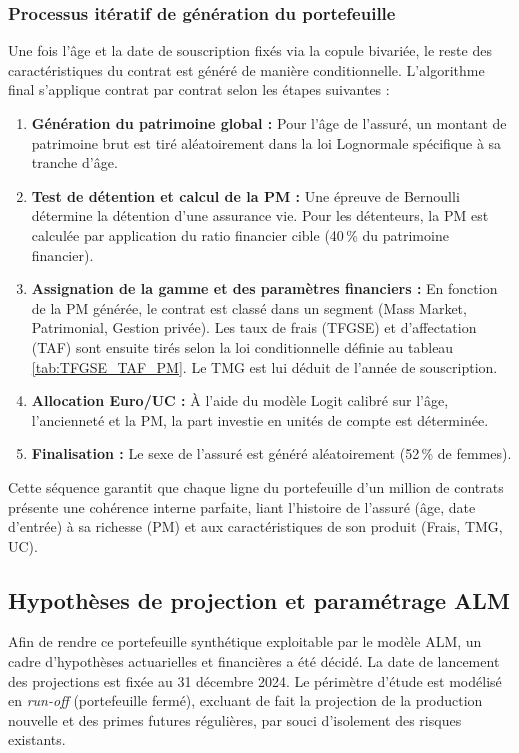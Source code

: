 \subsubsection{Processus itératif de génération du portefeuille}

Une fois l'âge et la date de souscription fixés via la copule bivariée, le reste des caractéristiques du contrat est généré de manière conditionnelle. L'algorithme final s'applique contrat par contrat selon les étapes suivantes :

\begin{enumerate}
    \item \textbf{Génération du patrimoine global :} Pour l'âge de l'assuré, un montant de patrimoine brut est tiré aléatoirement dans la loi Lognormale spécifique à sa tranche d'âge.
    \item \textbf{Test de détention et calcul de la PM :} Une épreuve de Bernoulli détermine la détention d'une assurance vie. Pour les détenteurs, la PM est calculée par application du ratio financier cible (40\,\% du patrimoine financier).
    \item \textbf{Assignation de la gamme et des paramètres financiers :} En fonction de la PM générée, le contrat est classé dans un segment (Mass Market, Patrimonial, Gestion privée). Les taux de frais (TFGSE) et d'affectation (TAF) sont ensuite tirés selon la loi conditionnelle définie au tableau \ref{tab:TFGSE_TAF_PM}. Le TMG est lui déduit de l'année de souscription.
    \item \textbf{Allocation Euro/UC :} À l'aide du modèle Logit calibré sur l'âge, l'ancienneté et la PM, la part investie en unités de compte est déterminée.
    \item \textbf{Finalisation :} Le sexe de l'assuré est généré aléatoirement (52\,\% de femmes).
\end{enumerate}

Cette séquence garantit que chaque ligne du portefeuille d'un million de contrats présente une cohérence interne parfaite, liant l'histoire de l'assuré (âge, date d'entrée) à sa richesse (PM) et aux caractéristiques de son produit (Frais, TMG, UC).

\subsection{Hypothèses de projection et paramétrage ALM}

Afin de rendre ce portefeuille synthétique exploitable par le modèle ALM, un cadre d'hypothèses actuarielles et financières a été décidé. La date de lancement des projections est fixée au 31 décembre 2024. Le périmètre d'étude est modélisé en \textit{run-off} (portefeuille fermé), excluant de fait la projection de la production nouvelle et des primes futures régulières, par souci d'isolement des risques existants. 

